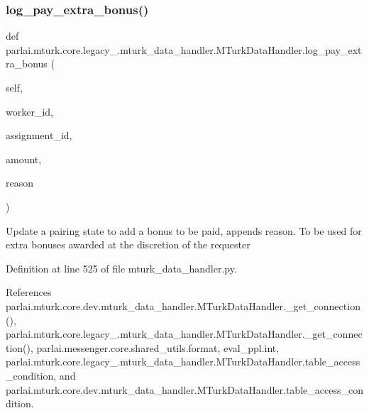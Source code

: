 \subsubsection{\texorpdfstring{log\+\_\+pay\+\_\+extra\+\_\+bonus()}{log\_pay\_extra\_bonus()}}
{\footnotesize\ttfamily def parlai.\+mturk.\+core.\+legacy\+\_.\+mturk\+\_\+data\+\_\+handler.\+M\+Turk\+Data\+Handler.\+log\+\_\+pay\+\_\+extra\+\_\+bonus (\begin{DoxyParamCaption}\item[{}]{self,  }\item[{}]{worker\+\_\+id,  }\item[{}]{assignment\+\_\+id,  }\item[{}]{amount,  }\item[{}]{reason }\end{DoxyParamCaption})}

\begin{DoxyVerb}Update a pairing state to add a bonus to be paid, appends reason.
To be used for extra bonuses awarded at the discretion of the requester
\end{DoxyVerb}
 

Definition at line 525 of file mturk\+\_\+data\+\_\+handler.\+py.



References parlai.\+mturk.\+core.\+dev.\+mturk\+\_\+data\+\_\+handler.\+M\+Turk\+Data\+Handler.\+\_\+get\+\_\+connection(), parlai.\+mturk.\+core.\+legacy\+\_.\+mturk\+\_\+data\+\_\+handler.\+M\+Turk\+Data\+Handler.\+\_\+get\+\_\+connection(), parlai.\+messenger.\+core.\+shared\+\_\+utils.\+format, eval\+\_\+ppl.\+int, parlai.\+mturk.\+core.\+legacy\+\_.\+mturk\+\_\+data\+\_\+handler.\+M\+Turk\+Data\+Handler.\+table\+\_\+access\+\_\+condition, and parlai.\+mturk.\+core.\+dev.\+mturk\+\_\+data\+\_\+handler.\+M\+Turk\+Data\+Handler.\+table\+\_\+access\+\_\+condition.

